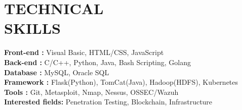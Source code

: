 \section{TECHNICAL\\SKILLS}
\textbf{Front-end : } \quad \quad 
Visual Basic, HTML/CSS, JavaScript
\\
\textbf{Back-end :} \quad \quad \quad 
C/C++, Python, Java, Bash Scripting, Golang
\\
\textbf{Database :} \quad \quad \quad 
MySQL, Oracle SQL
\\
\textbf{Framework :} \quad \quad 
Flask(Python), TomCat(Java), Hadoop(HDFS), Kubernetes
\\
\textbf{Tools :} \quad  \quad \quad \quad \quad 
Git, Metasploit, Nmap, Nessus, OSSEC/Wazuh
\\
\textbf{Interested fields: } Penetration Testing, Blockchain, Infrastructure